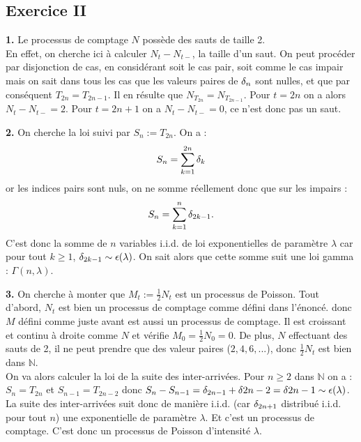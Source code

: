 \documentclass[a4paper,10pt]{report}
\begin{document}

\subsection*{Exercice II}


\textbf{1.} Le processus de comptage $N$ possède des sauts de taille 2.\\
En effet, on cherche ici à calculer $N_t - N_{t-}$, la taille d'un saut. On peut procéder par disjonction de cas, en considérant soit le cas pair, soit comme le cas impair mais on sait dans tous les cas que les valeurs paires de $\var_n$ sont nulles, et que par conséquent $T_{2n} = T_{2n-1}$. Il en résulte que $N_{T_{2n}} = N_{T_{2n-1}}$. Pour $t = 2n$ on a alors $N_t - N_{t-} = 2$. Pour $t = 2n + 1$ on a $N_t - N_{t-} = 0$, ce n'est donc pas un saut.
\newline


\textbf{2.} On cherche la loi suivi par $S_n := T_{2n}$. On a :
$$
S_n = \sum_{k = 1}^{2n} \var_{k}
$$
or les indices pairs sont nuls, on ne somme réellement donc que sur les impairs :
$$
S_n = \sum_{k = 1}^{n} \var_{2k-1}.
$$
C'est donc la somme de $n$ variables i.i.d. de loi exponentielles de paramètre $\lambda$ car pour tout $k \geq 1$, $\var_{2k-1} \sim \epsilon(\lambda)$. On sait alors que cette somme suit une loi gamma : $\Gamma(n,\lambda)$.
\newline


\textbf{3.} On cherche à monter que $M_t := \frac{1}{2}N_t$ est un processus de Poisson. Tout d'abord, $N_t$ est bien un processus de comptage comme défini dans l'énoncé. donc $M$ défini comme juste avant est aussi un processus de comptage. Il est croissant et continu à droite comme $N$ et vérifie $M_0 = \frac{1}{2} N_0 = 0$. De plus, $N$ effectuant des sauts de 2, il ne peut prendre que des valeur paires ($2,4,6, ...$), donc $\frac{1}{2} N_t$ est bien dans $\mathbb{N}$. \\
On va alors calculer la loi de la suite des inter-arrivées. Pour $n \geq 2$ dans $\mathbb{N}$ on a : $S_n = T_{2n}$ et $S_{n-1} = T_{2n-2}$ donc $S_n - S_{n-1} = \var_{2n-1} + \var{2n-2} = \var{2n -1} \sim \epsilon(\lambda)$. La suite des inter-arrivées suit donc de manière i.i.d. (car $\var_{2n+1}$ distribué i.i.d. pour tout $n$) une exponentielle de paramètre $\lambda$. Et c'est un processus de comptage. C'est donc un processus de Poisson d'intensité $\lambda$.
\end{document}
